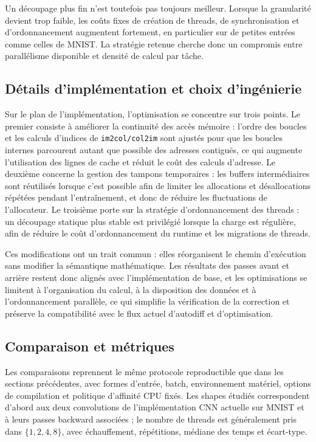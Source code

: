\documentclass[a4paper,11pt,oneside]{article}
\begin{document}
Un découpage plus fin n'est toutefois pas toujours meilleur. Lorsque la granularité devient trop faible, les coûts fixes de création de threads, de synchronisation et d'ordonnancement augmentent fortement, en particulier sur de petites entrées comme celles de MNIST. La stratégie retenue cherche donc un compromis entre parallélisme disponible et densité de calcul par tâche.

\subsection{Détails d'implémentation et choix d'ingénierie}

Sur le plan de l'implémentation, l'optimisation se concentre sur trois points. Le premier consiste à améliorer la continuité des accès mémoire : l'ordre des boucles et les calculs d'indices de \texttt{im2col/col2im} sont ajustés pour que les boucles internes parcourent autant que possible des adresses contiguës, ce qui augmente l'utilisation des lignes de cache et réduit le coût des calculs d'adresse. Le deuxième concerne la gestion des tampons temporaires : les buffers intermédiaires sont réutilisés lorsque c'est possible afin de limiter les allocations et désallocations répétées pendant l'entraînement, et donc de réduire les fluctuations de l'allocateur. Le troisième porte sur la stratégie d'ordonnancement des threads : un découpage statique plus stable est privilégié lorsque la charge est régulière, afin de réduire le coût d'ordonnancement du runtime et les migrations de threads.

Ces modifications ont un trait commun : elles réorganisent le chemin d'exécution sans modifier la sémantique mathématique. Les résultats des passes avant et arrière restent donc alignés avec l'implémentation de base, et les optimisations se limitent à l'organisation du calcul, à la disposition des données et à l'ordonnancement parallèle, ce qui simplifie la vérification de la correction et préserve la compatibilité avec le flux actuel d'autodiff et d'optimisation.

\subsection{Comparaison et métriques}

Les comparaisons reprennent le même protocole reproductible que dans les sections précédentes, avec formes d'entrée, batch, environnement matériel, options de compilation et politique d'affinité CPU fixés. Les shapes étudiés correspondent d'abord aux deux convolutions de l'implémentation CNN actuelle sur MNIST et à leurs passes backward associées ; le nombre de threads est généralement pris dans $\{1,2,4,8\}$, avec échauffement, répétitions, médiane des temps et écart-type.
\end{document}
